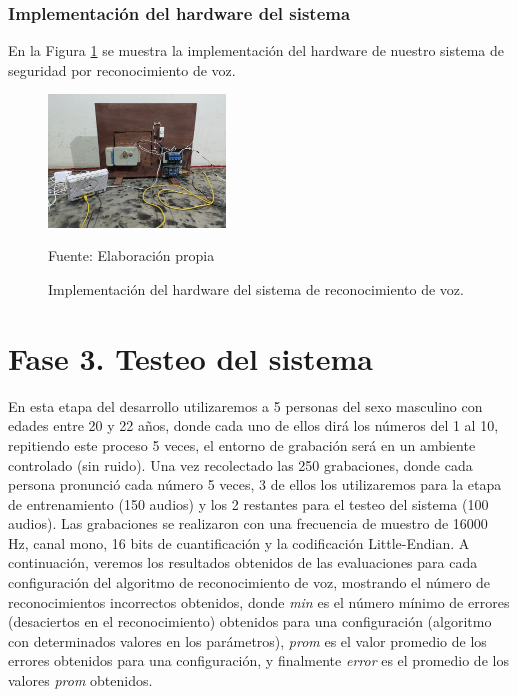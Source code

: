 \subsubsection{Implementación del hardware del sistema}
En la Figura \ref{fig:figura3.70} se muestra la implementación del hardware de nuestro sistema de seguridad por reconocimiento de voz.
\begin{figure}[H]
\captionsetup{justification=centering}
\begin{center}
\includegraphics[width=0.42\textwidth]{Imagenes/Cap3/image070}
\end{center}
\begin{center}
\vskip -0.5cm
\caption{\small{Implementación del hardware del sistema de reconocimiento de voz.}}
\label{fig:figura3.70}
{\small{Fuente: Elaboración propia}}
\end{center}
\end{figure}
\vskip -0.5cm
\newpage
\section{Fase 3. Testeo del sistema}
En esta etapa del desarrollo utilizaremos a 5 personas del sexo masculino con edades entre 20 y 22 años, donde cada uno de ellos dirá los números del 1 al 10, repitiendo este proceso 5 veces, el entorno de grabación será en un ambiente controlado (sin ruido).
\vskip 0.5cm
Una vez recolectado las 250 grabaciones, donde cada persona pronunció cada número 5 veces, 3 de ellos los utilizaremos para la etapa de entrenamiento (150 audios) y los 2 restantes para el testeo del sistema (100 audios). Las grabaciones se realizaron con una frecuencia de muestro de 16000 Hz, canal mono, 16 bits de cuantificación y la codificación Little-Endian.
\vskip 0.5cm
A continuación, veremos los resultados obtenidos de las evaluaciones para cada configuración del algoritmo de reconocimiento de voz, mostrando el número de reconocimientos incorrectos obtenidos, donde \textit{min} es el número mínimo de errores (desaciertos en el reconocimiento) obtenidos para una configuración (algoritmo con determinados valores en los parámetros), \textit{prom} es el valor promedio de los errores obtenidos para una configuración, y finalmente \textit{error} es el promedio de los valores \textit{prom} obtenidos.

